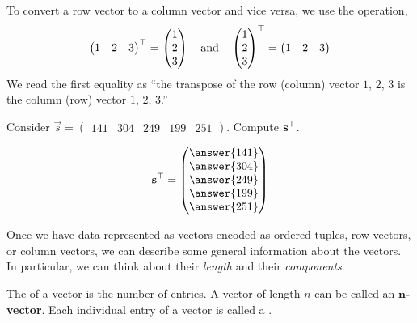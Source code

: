 \documentclass{ximera}
\begin{document}
\begin{definition}
  To convert a row vector to a column vector and vice versa, we use
  the  operation,
  \[
  \begin{pmatrix} 1 &  2 & 3 \end{pmatrix}^\top =
  \begin{pmatrix} 1 \\ 2 \\ 3 \end{pmatrix}
  \quad\text{and}\quad
  \begin{pmatrix} 1 \\ 2 \\ 3 \end{pmatrix}^\top =
  \begin{pmatrix} 1 &  2 & 3 \end{pmatrix}
  \]
  We read the first equality as ``the transpose of the row (column) vector $1$,
  $2$, $3$ is the column (row) vector $1$, $2$, $3$.''
\end{definition}


\begin{question}
  Consider $\vec{s} = \begin{pmatrix}141 & 304 & 249 & 199 & 251 \end{pmatrix}$. Compute $\mathbf{s}^\top$.
  \begin{prompt}
  \[
  \vec{s}^\transpose  = \begin{pmatrix}\answer{141} \\ \answer{304} \\ \answer{249} \\ \answer{199} \\ \answer{251} \end{pmatrix}
  \]
  \end{prompt}
\end{question}

Once we have data represented as vectors encoded as ordered tuples,
row vectors, or column vectors, we can describe some general
information about the vectors. In particular, we can think about their
\textit{length} and their \textit{components}.

\begin{definition}
The  of a vector is the number of entries.  A vector of
length $n$ can be called an $\boldsymbol n$\textbf{-vector}. Each
individual entry of a vector is called a .
\end{definition}
\end{document}
